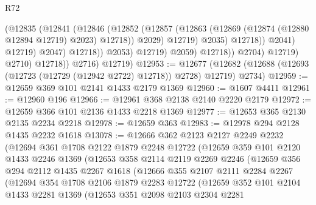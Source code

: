 \begin{lexlean}{R72}
\begin{coremodule}
                                      (@12835
                                        (@12841
                                          (@12846
                                            (@12852
                                              (@12857
                                                (@12863
                                                  (@12869
                                                    (@12874 (@12880 @12894 @12719) @2023)
                                                    @12718))
                                                @2029)
                                              @12719)
                                            @2035)
                                          @12718))
                                      @2041)
                                    @12719)
                                  @2047)
                                @12718))
                            @2053)
                          @12719)
                        @2059)
                      @12718))
                  @2704)
                @12719)
              @2710)
            @12718))
        @2716)
      @12719)
@12953 := @12677
    (@12682 (@12688 (@12693 (@12723 (@12729 (@12942 @2722) @12718)) @2728) @12719) @2734)
@12959 := @12659 @369 @101 @2141 @1433 @2179 @1369
@12960 := @1607 @4411
@12961 := @12960 @196
@12966 := @12961 @368 @2138 @2140 @2220 @2179
@12972 := @12659 @366 @101 @2136 @1433 @2218 @1369
@12977 := @12653 @365 @2130 @2135 @2234 @2218
@12978 := @12659 @363
@12983 := @12978 @294 @2128 @1435 @2232 @1618
@13078 := @12666
    @362
    @2123
    @2127
    @2249
    @2232
    (@12694
      @361
      @1708
      @2122
      @1879
      @2248
      @12722
      (@12659
        @359
        @101
        @2120
        @1433
        @2246
        @1369
        (@12653
          @358
          @2114
          @2119
          @2269
          @2246
          (@12659
            @356
            @294
            @2112
            @1435
            @2267
            @1618
            (@12666
              @355
              @2107
              @2111
              @2284
              @2267
              (@12694
                @354
                @1708
                @2106
                @1879
                @2283
                @12722
                (@12659
                  @352
                  @101
                  @2104
                  @1433
                  @2281
                  @1369
                  (@12653
                    @351
                    @2098
                    @2103
                    @2304
                    @2281

\end{coremodule}
\end{lexlean}
